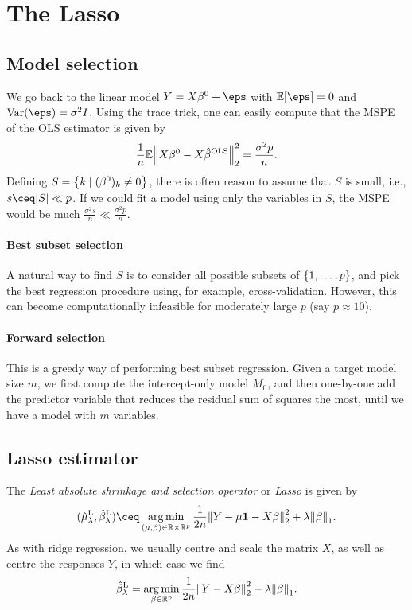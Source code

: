 \section{The Lasso}
\subsection{Model selection}
We go back to the linear model $Y = X\beta^0 + \eps$ with $\EE[\eps] = 0$ and $\Var(\eps) = \sigma^2 I$. Using the trace trick, one can easily compute that the MSPE of the OLS estimator is given by
\[
\frac1n \mathbb E\norm{X\beta^0 - X\hat\beta^\mathrm{OLS}}_2^2 = \frac{\sigma^2 p}{n}. 
\]
Defining $S = \qty{k \mid (\beta^0)_k \neq 0}$, there is often reason to assume that $S$ is small, i.e., $s \ceq \abs{S} \ll p$. If we could fit a model using only the variables in $S$, the MSPE would be much $\frac{\sigma^2 s}{n} \ll \frac{\sigma^2 p}{n}$. 

\paragraph{Best subset selection} A natural way to find $S$ is to consider all possible subsets of $\qty{1, \dotsc, p}$, and pick the best regression procedure using, for example, cross-validation. However, this can become computationally infeasible for moderately large $p$ (say $p \approx 10$). 

\paragraph{Forward selection} This is a greedy way of performing best subset regression. Given a target model size $m$, we first compute the intercept-only model $M_0$, and then one-by-one add the predictor variable that reduces the residual sum of squares the most, until we have a model with $m$ variables. 

\subsection{Lasso estimator}
The \emph{Least absolute shrinkage and selection operator} or \emph{Lasso} is given by
\[
(\hat\mu_\lambda^\Rm{L}, \hat\beta_\lambda^\Rm{L}) \ceq \argmin_{(\mu, \beta) \in \RR \times \RR^p} \frac1{2n}\norm{Y- \mu \vec 1 - X\beta}_2^2 + \lambda \norm{\beta}_1. 
\]
As with ridge regression, we usually centre and scale the matrix $X$, as well as centre the responses $Y$, in which case we find
\[
\hat\beta_\lambda^\mathrm{L} = \operatorname*{arg\,min}_{\beta \in \mathbb R^p} \frac1{2n}\norm{Y - X\beta}_2^2 + \lambda \norm{\beta}_1. 
\]

